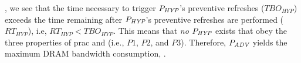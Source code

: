 , we see that the time necessary to trigger $P_{\textit{HYP}}{}$'s preventive refreshes ($\textit{TBO}_{HYP}$) exceeds the time remaining after $P_{\textit{HYP}}{}$'s preventive refreshes are performed ($\textit{RT}_{HYP}$), i.e, $\textit{RT}_{HYP} < \textit{TBO}_{HYP}$.
This means that \emph{no} $P_{\textit{HYP}}{}$ exists that obey the three properties of \gls{prac} and \X{} (i.e., $P1$, $P2$, and $P3$).
Therefore, $P_{\textit{ADV}}{}$  yields the maximum DRAM bandwidth consumption, .